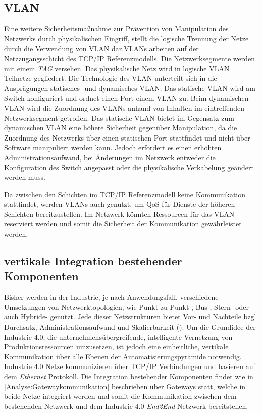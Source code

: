 \subsection{\ac{VLAN}}
\label{Analyse:VLAN}
Eine weitere Sicherheitsmaßnahme zur Prävention von Manipulation des Netzwerks durch physikalischen Eingriff, stellt die logische Trennung der Netze durch die Verwendung von \ac{VLAN} dar.\ac{VLAN}s arbeiten auf der Netzzugangsschicht des \ac{TCP}/\ac{IP} Referenzmodells. Die Netzwerksegmente werden mit einem \textit{TAG} versehen. Das physikalische Netz wird in logische \ac{VLAN} Teilnetze gegliedert. Die Technologie des \ac{VLAN} unterteilt sich in die Ausprägungen statisches- und dynamisches-\ac{VLAN}. Das statische \ac{VLAN} wird am Switch konfiguriert und ordnet einen Port einem \ac{VLAN} zu. Beim dynamischen \ac{VLAN} wird die Zuordnung des \ac{VLAN}s anhand von Inhalten im eintreffenden Netzwerksegment getroffen. Das statische \ac{VLAN} bietet im Gegensatz zum dynamischen \ac{VLAN} eine höhere Sicherheit gegenüber Manipulation, da die Zuordnung des Netzwerks über einen statischen Port stattfindet und nicht über Software manipuliert werden kann. Jedoch erfordert es einen erhöhten Administrationsaufwand, bei Änderungen im Netzwerk entweder die Konfiguration des Switch angepasst oder die physikalische Verkabelung geändert werden muss.

Da zwischen den Schichten im \ac{TCP}/\ac{IP} Referenzmodell keine Kommunikation stattfindet, werden \ac{VLAN}s auch genutzt, um \ac{QoS} für Dienste der höheren Schichten bereitzustellen. Im Netzwerk könnten Ressourcen für das \ac{VLAN} reserviert werden und somit die Sicherheit der Kommunikation gewährleistet werden. 

\subsection{vertikale Integration bestehender Komponenten}
Bisher werden in der Industrie, je nach Anwendungsfall, verschiedene Umsetzungen von Netzwerktopologien, wie Punkt-zu-Punkt-, Bus-, Stern- oder auch Hybride- genutzt. Jede dieser Netzstrukturen bietet Vor- und Nachteile bzgl. Durchsatz, Administrationsaufwand und Skalierbarkeit (\cite{burke2013}). Um die Grundidee der Industrie 4.0, die unternehmensübergreifende, intelligente Vernetzung von Produktionsressourcen umzusetzen, ist jedoch eine einheitliche, vertikale Kommunikation über alle Ebenen der Automatisierungspyramide notwendig. Industrie 4.0 Netze kommunizieren über \ac{TCP}/\ac{IP} Verbindungen und basieren auf dem \textit{Ethernet} Protokoll. Die Integration bestehender Komponenten findet wie in \autoref{Analyse:Gatewaykommunikation} beschrieben über Gateways statt, welche in beide Netze integriert werden und somit die Kommunikation zwischen dem bestehenden Netzwerk und dem Industrie 4.0 \textit{End2End} Netzwerk bereitstellen.

